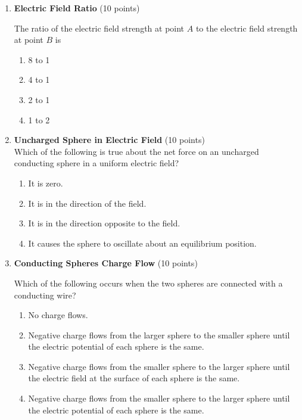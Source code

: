 \begin{enumerate}
  \item \textbf{Electric Field Ratio} (10 points)\\
  
  The ratio of the electric field strength at point $A$ to the electric field strength at point $B$ is
  \begin{enumerate}[label=(\Alph*)]
    \item 8 to 1
    \item 4 to 1
    \item 2 to 1
    \item 1 to 2
  \end{enumerate}
  \begin{subanswer}
  \end{subanswer}

  \item \textbf{Uncharged Sphere in Electric Field} (10 points)\\
  Which of the following is true about the net force on an uncharged conducting sphere in a uniform electric field?
  \begin{enumerate}[label=(\Alph*)]
    \item It is zero.
    \item It is in the direction of the field.
    \item It is in the direction opposite to the field.
    \item It causes the sphere to oscillate about an equilibrium position.
  \end{enumerate}
  \begin{subanswer}
  \end{subanswer}

  \item \textbf{Conducting Spheres Charge Flow} (10 points)\\
  
  Which of the following occurs when the two spheres are connected with a conducting wire?
  \begin{enumerate}[label=(\Alph*)]
    \item No charge flows.
    \item Negative charge flows from the larger sphere to the smaller sphere until the electric potential of each sphere is the same.
    \item Negative charge flows from the smaller sphere to the larger sphere until the electric field at the surface of each sphere is the same.
    \item Negative charge flows from the smaller sphere to the larger sphere until the electric potential of each sphere is the same.
  \end{enumerate}
  \begin{subanswer}
  \end{subanswer}


\end{enumerate}
